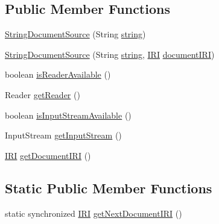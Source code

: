 \subsection*{Public Member Functions}
\begin{DoxyCompactItemize}
\item 
\hyperlink{classorg_1_1semanticweb_1_1owlapi_1_1io_1_1_string_document_source_a46ac6d2c7fd2386667af329556a250a7}{String\-Document\-Source} (String \hyperlink{classorg_1_1semanticweb_1_1owlapi_1_1io_1_1_string_document_source_a12c815ec709513d123caed5ca98039bd}{string})
\item 
\hyperlink{classorg_1_1semanticweb_1_1owlapi_1_1io_1_1_string_document_source_a3c63729e9d155adf63a90a19760608d2}{String\-Document\-Source} (String \hyperlink{classorg_1_1semanticweb_1_1owlapi_1_1io_1_1_string_document_source_a12c815ec709513d123caed5ca98039bd}{string}, \hyperlink{classorg_1_1semanticweb_1_1owlapi_1_1model_1_1_i_r_i}{I\-R\-I} \hyperlink{classorg_1_1semanticweb_1_1owlapi_1_1io_1_1_string_document_source_a8cdc50ee5f4be1700eb905ea32afd79c}{document\-I\-R\-I})
\item 
boolean \hyperlink{classorg_1_1semanticweb_1_1owlapi_1_1io_1_1_string_document_source_af7a782861458a3ff0e7f458af1d49877}{is\-Reader\-Available} ()
\item 
Reader \hyperlink{classorg_1_1semanticweb_1_1owlapi_1_1io_1_1_string_document_source_a403325bbf333f1c0eaa410770dbc23bc}{get\-Reader} ()
\item 
boolean \hyperlink{classorg_1_1semanticweb_1_1owlapi_1_1io_1_1_string_document_source_add18f18793a524683a54bdf180a58271}{is\-Input\-Stream\-Available} ()
\item 
Input\-Stream \hyperlink{classorg_1_1semanticweb_1_1owlapi_1_1io_1_1_string_document_source_abe45464b1c4ed58c531dc6a8d89be56d}{get\-Input\-Stream} ()
\item 
\hyperlink{classorg_1_1semanticweb_1_1owlapi_1_1model_1_1_i_r_i}{I\-R\-I} \hyperlink{classorg_1_1semanticweb_1_1owlapi_1_1io_1_1_string_document_source_a8c15704aaf3aa4f332e5a9c4129924b2}{get\-Document\-I\-R\-I} ()
\end{DoxyCompactItemize}
\subsection*{Static Public Member Functions}
\begin{DoxyCompactItemize}
\item 
static synchronized \hyperlink{classorg_1_1semanticweb_1_1owlapi_1_1model_1_1_i_r_i}{I\-R\-I} \hyperlink{classorg_1_1semanticweb_1_1owlapi_1_1io_1_1_string_document_source_af964d0386d04d55b972e1938ef62ae60}{get\-Next\-Document\-I\-R\-I} ()
\end{DoxyCompactItemize}
